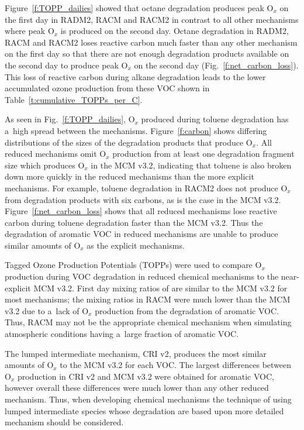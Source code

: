 \documentclass[acpd, online, hvmath]{copernicus}
\begin{document}
Figure~\ref{f:TOPP_dailies} showed that octane degradation produces
peak O$_{x}$ on the first day in RADM2, RACM and RACM2 in contrast
to all other mechanisms where peak O$_{x}$ is produced on the
second day.  Octane degradation in RADM2, RACM and RACM2 loses
reactive carbon much faster than any other mechanism on the first day
so that there are not enough degradation products available on the
second day to produce peak O$_{x}$ on the second day
(Fig.~\ref{f:net_carbon_loss}).  This loss of reactive carbon during
alkane degradation leads to the lower accumulated ozone production
from these VOC shown in Table~\ref{t:cumulative_TOPPs_per_C}.

As seen in Fig.~\ref{f:TOPP_dailies}, O$_{x}$ produced during
toluene degradation has a~high spread between the mechanisms.
Figure~\ref{f:carbon} shows differing distributions of the sizes of
the degradation products that produce O$_{x}$.  All reduced
mechanisms omit O$_{x}$ production from at least one degradation
fragment size which produces O$_{x}$ in the MCM v3.2, indicating
that toluene is also broken down more quickly in the reduced
mechanisms than the more explicit mechanisms.  For example, toluene
degradation in RACM2 does not produce O$_{x}$ from degradation
products with six carbons, as is the case in the MCM v3.2.
Figure~\ref{f:net_carbon_loss} shows that all reduced mechanisms lose
reactive carbon during toluene degradation faster than the MCM v3.2.
Thus the degradation of aromatic VOC in reduced mechanisms are unable
to produce similar amounts of O$_{x}$ as the explicit mechanisms.



\conclusions

Tagged Ozone Production Potentials (TOPPs) were used to compare
O$_{x}$ production during VOC degradation in reduced chemical
mechanisms to the near-explicit MCM v3.2.  First day mixing ratios of
 are similar to the MCM v3.2 for most mechanisms; the
 mixing ratios in RACM were much lower than the MCM v3.2 due
to a~lack of O$_{x}$ production from the degradation of aromatic
VOC.  Thus, RACM may not be the appropriate chemical mechanism when
simulating atmospheric conditions having a~large fraction of aromatic
VOC.

The lumped intermediate mechanism, CRI v2, produces the most similar
amounts of O$_{x}$ to the MCM v3.2 for each VOC.  The largest
differences between O$_{x}$ production in CRI v2 and MCM v3.2 were
obtained for aromatic VOC, however overall these differences were much
lower than any other reduced mechanism.  Thus, when developing
chemical mechanisms the technique of using lumped intermediate species
whose degradation are based upon more detailed mechanism should be
considered.
\end{document}
